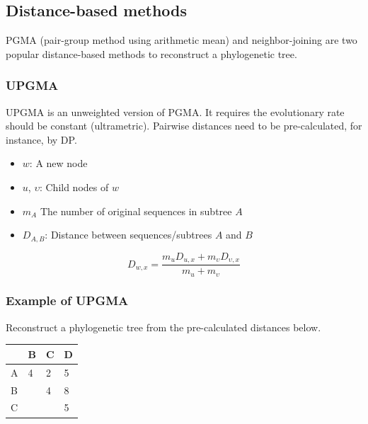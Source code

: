 %
%

%
%
\subsection{Distance-based methods}
PGMA (pair-group method using arithmetic mean) and neighbor-joining are two popular distance-based methods to reconstruct a phylogenetic tree.

%
%
\subsubsection*{UPGMA}
UPGMA is an unweighted version of PGMA. It requires the evolutionary rate should be constant (ultrametric). Pairwise distances need to be pre-calculated, for instance, by DP.

\begin{itemize}
\item $w$: A new node
\item $u$, $\upsilon$: Child nodes of $w$
\item $m_{A}$ The number of original sequences in subtree $A$
\item $D_{A,B}$: Distance between sequences/subtrees $A$ and $B$
\end{itemize}

\[
D_{w,x}=\dfrac{m_{u}D_{u,x} + m_{\upsilon}D_{\upsilon,x}}{m_{u} + m_{\upsilon}}
\]

%
%
\subsubsection*{Example of UPGMA}
Reconstruct a phylogenetic tree from the pre-calculated distances below.

\begin{table}[H]
\centering
\begin{tabular}{|l|l|l|l|}
\hline
  & B & C & D \\ \hline
A & 4 & 2 & 5 \\ \hline
B &   & 4 & 8 \\ \hline
C &   &   & 5 \\ \hline
\end{tabular}
\end{table}

